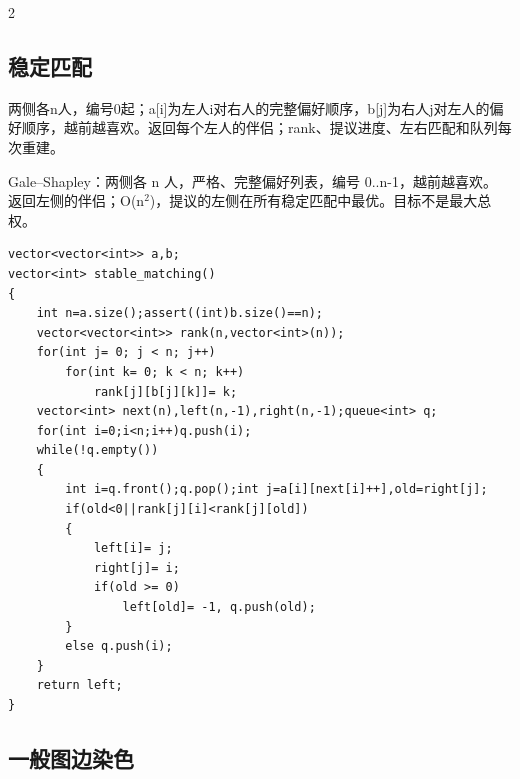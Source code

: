\documentclass[UTF8,fontset=fandol,a4paper,twoside]{ctexart}
\newcommand{\note}[1]{{\fontsize{10}{12}\selectfont #1\par}}
\begin{document}
\begin{multicols}{2}
\subsection{稳定匹配}

\note{两侧各n人，编号0起；a[\allowbreak{}i]\allowbreak{}为左人i对右人的完整偏好顺序，b[\allowbreak{}j]\allowbreak{}为右人j对左人的偏好顺序，越前越喜欢。返回每个左人的伴侣；rank、提议进度、左右匹配和队列每次重建。}
\note{Gale–Shapley：两侧各 n 人，严格、完整偏好列表，编号 0.\allowbreak{}.\allowbreak{}n-\allowbreak{}1，越前越喜欢。 返回左侧的伴侣；O(\allowbreak{}n\ensuremath{^2})\allowbreak{}，提议的左侧在所有稳定匹配中最优。目标不是最大总权。}
\begin{lstlisting}
vector<vector<int>> a,b;
vector<int> stable_matching()
{
    int n=a.size();assert((int)b.size()==n);
    vector<vector<int>> rank(n,vector<int>(n));
    for(int j= 0; j < n; j++)
        for(int k= 0; k < n; k++)
            rank[j][b[j][k]]= k;
    vector<int> next(n),left(n,-1),right(n,-1);queue<int> q;
    for(int i=0;i<n;i++)q.push(i);
    while(!q.empty())
    {
        int i=q.front();q.pop();int j=a[i][next[i]++],old=right[j];
        if(old<0||rank[j][i]<rank[j][old])
        {
            left[i]= j;
            right[j]= i;
            if(old >= 0)
                left[old]= -1, q.push(old);
        }
        else q.push(i);
    }
    return left;
}
\end{lstlisting}
\subsection{一般图边染色}


\end{multicols}
\end{document}

